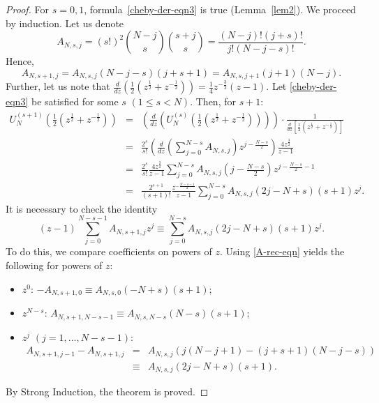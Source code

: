 \documentclass[12pt]{article}
\newcommand{\pa}[1]{\left(#1\right)}
\newcommand{\br}[1]{\left[#1\right]}
\begin{document}
\begin{proof}
For $s = 0,1$, formula~\eqref{cheby-der-eqn3} is true (Lemma~\ref{lem2}). We proceed by induction. Let us denote
\begin{displaymath}
A_{N,s,j} =(s!)^2{N-j\choose s}{s+j\choose s}= \frac{(N - j)!(j + s)!}{j!(N - j - s)!}.
\end{displaymath}
Hence,
\begin{equation}\label{A-rec-eqn}
A_{N,s + 1,j} = A_{N,s,j}(N - j - s)(j + s + 1) = A_{N,s,j + 1}(j + 1)(N - j).
\end{equation}
Further, let us note that
$\displaystyle \frac{d}{dz}\pa{\frac{1}{2}\pa{z^{\frac{1}{2}} + z^{-\frac{1}{2}}}} = \frac{1}{4}z^{-\frac{3}{2}}(z - 1)$. Let \eqref{cheby-der-eqn3} be satisfied for some $s$ $\pa{1 \leq s < N}$. Then, for $s + 1$:
\begin{eqnarray*}
U_N^{(s + 1)}\pa{\frac{1}{2}\pa{z^{\frac{1}{2}} + z^{-\frac{1}{2}}}} 
&=& \pa{\frac{d}{dz}\pa{U_N^{(s)}\pa{\frac{1}{2}\pa{z^{\frac{1}{2}} + z^{-\frac{1}{2}}}}}} \cdot \frac{1}{\frac{d}{dz}\br{\frac{1}{2}\pa{z^{\frac{1}{2}} + z^{-\frac{1}{2}}}}}\\
&=& \frac{2^s}{s!}\pa{\frac{d}{dz}\pa{\sum_{j = 0}^{N - s}A_{N,s,j}}z^{j - \frac{N - s}{2}}}\frac{4z^{\frac{3}{2}}}{z - 1} \\
&=& \frac{2^s}{s!}\frac{4z^{\frac{3}{2}}}{z - 1}\sum_{j = 0}^{N-s}A_{N,s,j}\pa{j - \frac{N-s}{2}}z^{j - \frac{N - s}{2} - 1} \\
&=& \frac{2^{s + 1}}{(s + 1)!}\frac{z^{-\frac{N-s-1}{2}}}{z - 1}\sum_{j = 0}^{N-s}A_{N,s,j}(2j - N + s)(s + 1)z^j.
\end{eqnarray*}
It is necessary to check the identity
\begin{displaymath}
(z - 1)\sum_{j = 0}^{N - s - 1}A_{N,s + 1,j}z^j \equiv \sum_{j = 0}^{N - s}A_{N,s,j}(2j - N + s)(s + 1)z^j.
\end{displaymath}
To do this, we compare coefficients on powers of $z$. Using \eqref{A-rec-eqn} yields the following for powers of $z$:
\begin{itemize}
\item $z^0$: $-A_{N,s + 1,0} \equiv A_{N,s,0}(-N + s)(s + 1)$;
\item $z^{N - s}$: $A_{N,s + 1,N - s - 1} \equiv A_{N,s,N - s}(N - s)(s + 1)$;
\item $z^j$ $\pa{j = 1, \ldots, N - s - 1}$:
\begin{eqnarray*}
A_{N,s + 1,j - 1} - A_{N,s + 1,j} &=& A_{N,s,j}(j(N - j + 1) - (j + s + 1)(N - j - s)) \\
&\equiv& A_{N,s,j}(2j - N + s)(s + 1).
\end{eqnarray*}
\end{itemize}
By Strong Induction, the theorem is proved.
\end{proof}
\end{document}
